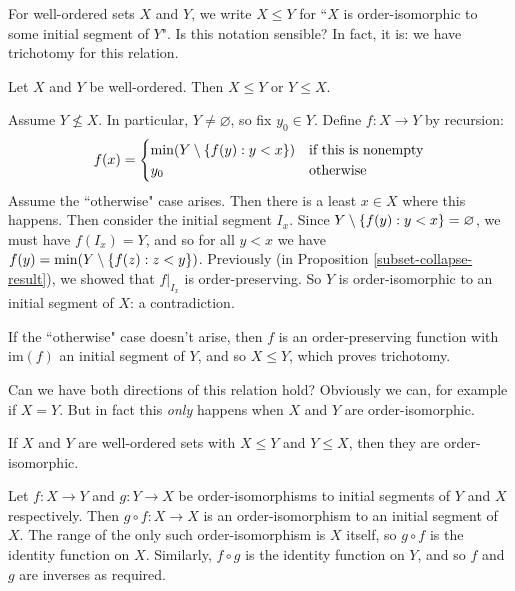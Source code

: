 \documentclass{article}
\begin{document}
For well-ordered sets $X$ and $Y$, we write $X \leq Y$ for ``$X$ is order-isomorphic to some initial segment of $Y$". Is this notation sensible? In fact, it is: we have trichotomy for this relation.

\begin{theorem}
	\label{order-isomorphism-trichotomy}
    Let $X$ and $Y$ be well-ordered. Then $X \leq Y$ or $Y \leq X$.
\end{theorem}

\begin{prf}
    Assume $Y \not\leq X$. In particular, $Y \neq \varnothing$, so fix $y_0 \in Y$. Define $f: X \to Y$ by recursion:
    \[
	f(x) = \begin{cases}
		\min(Y \setminus\left\lbrace f(y) : y < x \right\rbrace) & \text{if this is nonempty} \\
		y_0 & \!\mathrel{\, \text{otherwise}}
	\end{cases}
	\]
	Assume the ``otherwise" case arises. Then there is a least $x \in X$ where this happens. Then consider the initial segment $I_x$. Since $Y \setminus\left\lbrace f(y) : y < x \right\rbrace = \varnothing$, we must have $f(I_x) = Y$, and so for all $y < x$ we have $f(y) = \min (Y \setminus \left\lbrace f(z) : z < y \right\rbrace)$. Previously (in Proposition \ref{subset-collapse-result}), we showed that $f|_{I_x}$ is order-preserving. So $Y$ is order-isomorphic to an initial segment of $X$: a contradiction.
	
	If the ``otherwise" case doesn't arise, then $f$ is an order-preserving function with $\mathrm{im}(f)$ an initial segment of $Y$, and so $X \leq Y$, which proves trichotomy.
\end{prf}

Can we have both directions of this relation hold? Obviously we can, for example if $X = Y$. But in fact this \textit{only} happens when $X$ and $Y$ are order-isomorphic.

\begin{proposition}
    If $X$ and $Y$ are well-ordered sets with $X \leq Y$ and $Y \leq X$, then they are order-isomorphic.
\end{proposition}

\begin{prf}
    Let $f: X \to Y$ and $g: Y \to X$ be order-isomorphisms to initial segments of $Y$ and $X$ respectively. Then $g \circ f: X \to X$ is an order-isomorphism to an initial segment of $X$. The range of the  only such order-isomorphism is $X$ itself, so $g \circ f$ is the identity function on $X$. Similarly, $f \circ g$ is the identity function on $Y$, and so $f$ and $g$ are inverses as required.
\end{prf}
\end{document}

